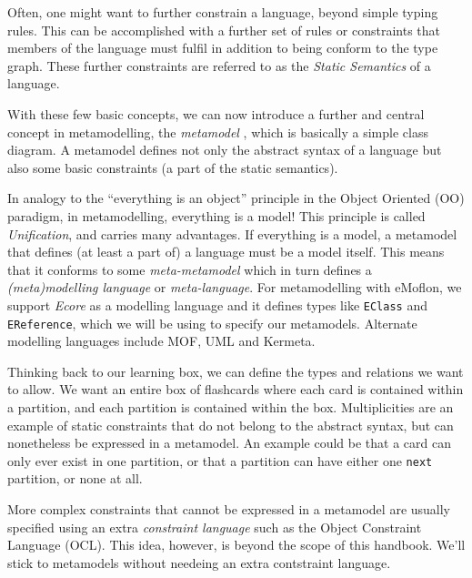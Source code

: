 Often, one might want to further constrain a language, beyond simple typing rules.  This can be accomplished with a
further set of rules or constraints that members of the language must fulfil in addition to being conform to the type graph.
These further constraints are referred to as the \emph{Static Semantics} of a language.

With these few basic concepts, we can now introduce a further and central concept in metamodelling, the \emph{metamodel} , which is
basically a simple class diagram. A metamodel defines not only the abstract syntax of a language but also some basic constraints (a part of the static
semantics).

In analogy to the ``everything is an object'' principle in the Object Oriented (OO) paradigm, in metamodelling, everything is a
model! This principle is called \emph{Unification},  and carries many advantages. If everything is a model, a metamodel that
defines (at least a part of) a language must be a model itself. This means that it conforms to some \emph{meta-metamodel}
which in turn defines a \emph{(meta)modelling language} or \emph{meta-language}.
For metamodelling with eMoflon, we support \emph{Ecore} as a modelling language and it defines types like \texttt{EClass} and \texttt{EReference}, which we will
be using to specify  our metamodels. Alternate modelling languages include MOF, UML and Kermeta.

Thinking back to our learning box, we can define the types and relations we want to allow. We want an entire box of flashcards where each card is contained
within a partition, and each partition is contained within the box. Multiplicities are an example of static constraints that do not belong to the abstract
syntax, but can nonetheless be expressed in a metamodel.
An example could be that a card can only ever exist in one partition, or that a partition can have either one \texttt{next} partition, or none at all.

More complex constraints that cannot be expressed in a metamodel are usually specified using an extra \emph{constraint language} such as the Object Constraint Language (OCL). This idea, however,  is beyond the scope of this handbook. We'll stick to metamodels without needeing
an extra contstraint language.


